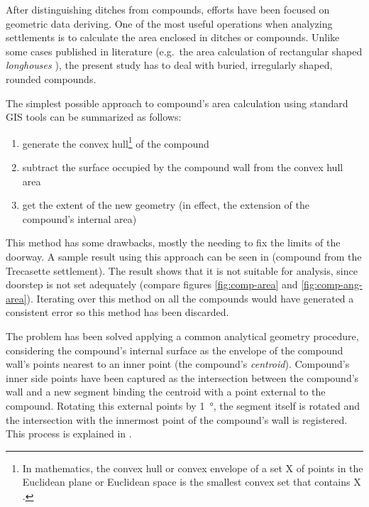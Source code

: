             After distinguishing ditches from compounds, efforts have been focused on geometric data deriving. One of the most useful operations when analyzing settlements is to calculate the area enclosed in ditches or compounds. Unlike some cases published in literature (e.g.\ the area calculation of rectangular shaped \emph{longhouses} \cite{spatial-south-europe}), the present study has to deal with buried, irregularly shaped, rounded compounds.

            The simplest possible approach to compound's area calculation using standard GIS tools can be summarized as follows:
            
            \begin{enumerate}
                \item generate the convex hull\footnote{In mathematics, the convex hull or convex envelope of a set X of points in the Euclidean plane or Euclidean space is the smallest convex set that contains X \cite{wiki:hull}.} of the compound
                \item subtract the surface occupied by the compound wall from the convex hull area
                \item get the extent of the new geometry (in effect, the extension of the compound's internal area)
            \end{enumerate}

            This method has some drawbacks, mostly the needing to fix the limits of the doorway. A sample result using this approach can be seen in  (compound from the Trecasette settlement). The result shows that it is not suitable for analysis, since doorstep is not set adequately (compare figures \ref{fig:comp-area} and \ref{fig:comp-ang-area}). Iterating over this method on all the compounds would have generated a consistent error so this method has been discarded.

            The problem has been solved applying a common analytical geometry procedure, considering the compound's internal surface as the envelope of the compound wall's points nearest to an inner point (the compound's \emph{centroid}). Compound's inner side points have been captured as the intersection between the compound's wall and a new segment binding the centroid with a point external to the compound. Rotating this external points by \SI{1}{\degree}, the segment itself is rotated and the intersection with the innermost point of the compound's wall is registered. This process is explained in .
            
